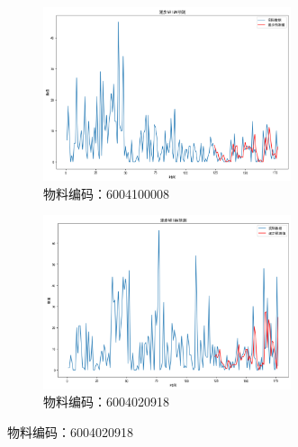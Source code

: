 \documentclass{cumcmthesis}
\begin{document}
\begin{figure}[ht]
            \begin{subfigure}[b]{0.49\textwidth}
                \includegraphics[width=0.8\textwidth]{graph/graph_11.png}
                \caption{物料编码：6004100008}
                \label{fig:image3}
            \end{subfigure}
            \hfill %
            \begin{subfigure}[b]{0.49\textwidth}
                \includegraphics[width=0.8\textwidth]{graph/graph_10.png}
                \caption{物料编码：6004020918}
                \label{fig:image4}
            \end{subfigure}


\end{figure}
\end{document}
